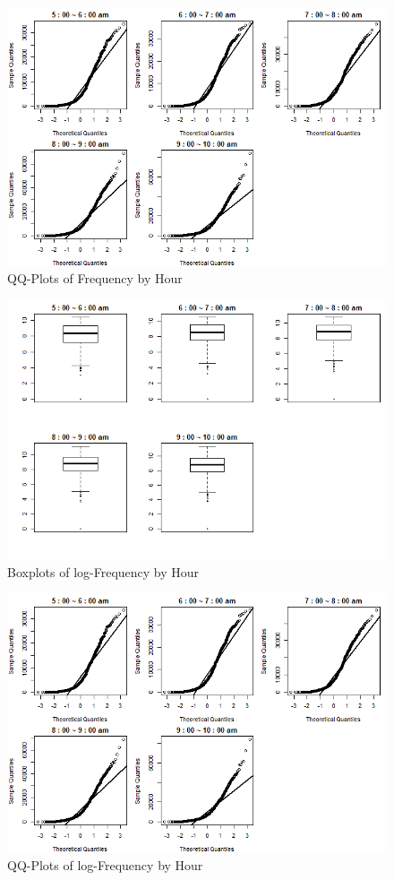 \documentclass[hidelinks,12pt]{article}
\begin{document}
	\begin{figure}[!ht]
		\includegraphics[width=\textwidth]{qq.png}
		\caption{QQ-Plots of Frequency by Hour \label{fig:qq}}
	\end{figure}
	\begin{figure}[!ht]
		\includegraphics[width=\textwidth]{box_log.png}
		\caption{Boxplots of log-Frequency by Hour \label{fig:lgboxplot}}
	\end{figure}
	\begin{figure}[!ht]
		\includegraphics[width=\textwidth]{qq.png}
		\caption{QQ-Plots of log-Frequency by Hour \label{fig:lgqq}}
	\end{figure}
\end{document}
